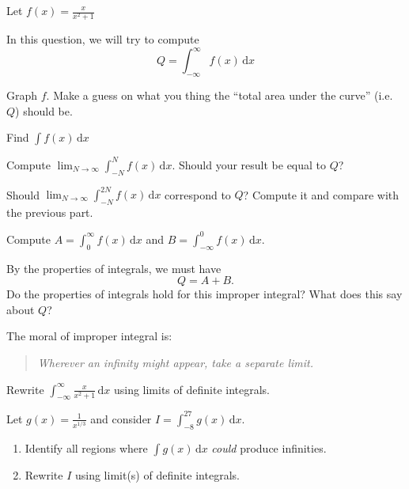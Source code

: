 \documentclass{workbook}
\begin{document}
\begin{slide}
	\question
	Let $\displaystyle f(x)=\frac{x}{x^2+1}$

	In this question, we will try to compute
	\[
	Q=\int_{-\infty}^\infty f(x)\,\mathrm d x
	\]

	\begin{parts}
		\item Graph $f$. Make a guess on what you thing the ``total area under the curve'' (i.e. $Q$) should be.
		\item Find $\displaystyle \int f(x)\,\mathrm d x$
		\item Compute $
		\displaystyle 
		\lim_{N\to\infty} \int_{-N}^N f(x)\,\mathrm d x
		$. Should your result be equal to $Q$?
		\item Should $
		\displaystyle 
		\lim_{N\to\infty} \int_{-N}^{2N} f(x)\,\mathrm d x
		$ correspond to $Q$? Compute it and compare with the previous part.

		\item Compute $A=\displaystyle \int_0^\infty f(x)\,\mathrm d x$
		and $B=\displaystyle \int_{-\infty}^0 f(x)\,\mathrm d x$.

		\item By the properties of integrals, we must have
		\[
			Q=A+B.
		\]
		Do the properties of integrals hold for this improper integral?
		What does this say about $Q$?
	\end{parts}
\end{slide}

\begin{slide}
	\question
	The moral of improper integral is:
	\begin{quote}
		\emph{Wherever an infinity might appear, take a separate limit.}
	\end{quote}

	\begin{parts}
		\item Rewrite 
		$\displaystyle \int_{-\infty}^\infty \frac{x}{x^2+1}\,\mathrm d x$
		using limits of definite integrals.
		\item Let $g(x)=\frac{1}{x^{1/3}}$ and consider 
		$I=\displaystyle \int_{-8}^{27} g(x)\,\mathrm d x$.

		\begin{enumerate}
			\item Identify all regions where $\displaystyle \int g(x)\,\mathrm d x$ \emph{could} produce infinities.
			\item Rewrite $I$ using limit(s) of definite integrals.
		\end{enumerate}
	\end{parts}

\end{slide}
\end{document}

